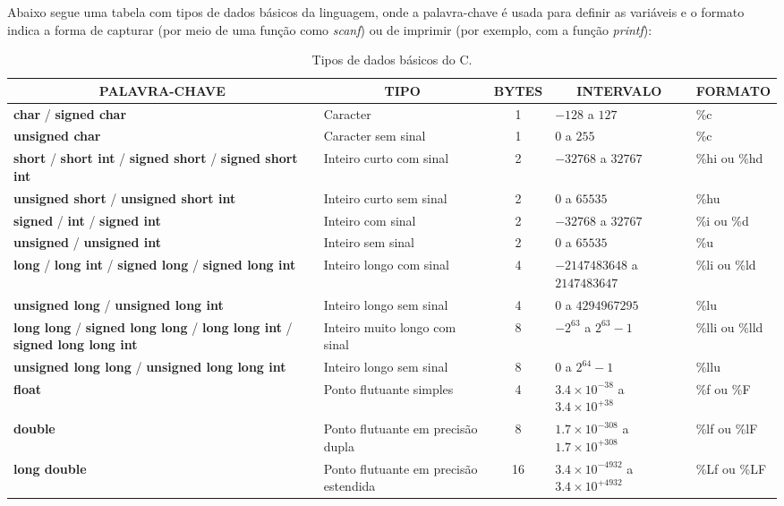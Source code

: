 Abaixo segue uma tabela com tipos de dados básicos da linguagem, onde a palavra-chave é usada para definir as variáveis e o formato indica a forma de capturar (por meio de uma função como \textit{scanf}) ou de imprimir (por exemplo, com a função \textit{printf}):
\begin{table}[!htbp]
\centering
\label{tab1}{
\begin{tabular}{|m{4.5cm}|m{2cm}|c|m{3cm}|m{2.6cm}|}
\hline
\multicolumn{1}{|c|}{\textbf{PALAVRA-CHAVE}} & \multicolumn{1}{c|}{\textbf{TIPO}} & \multicolumn{1}{c|}{\textbf{BYTES}} & \multicolumn{1}{c|}{\textbf{INTERVALO}} & \multicolumn{1}{c|}{\textbf{FORMATO}} \\\hline
\textbf{char} / \textbf{signed char} & Caracter & 1 & $-128$ a $127$ & \%c \\\hline
\textbf{unsigned char} & Caracter sem sinal & 1 & $0$ a $255$ & \%c \\\hline
\textbf{short} / \textbf{short int} / \textbf{signed short} / \textbf{signed short int} & Inteiro curto com sinal & 2 & $-32768$ a $32767$ & \%hi ou \%hd \\\hline
\textbf{unsigned short} / \textbf{unsigned short int} & Inteiro curto sem sinal & 2 & $0$ a $65535$ & \%hu \\\hline
\textbf{signed} / \textbf{int} / \textbf{signed int} & Inteiro com sinal & 2 & $-32768$ a $32767$ & \%i ou \%d \\\hline
\textbf{unsigned} / \textbf{unsigned int} & Inteiro sem sinal & 2 & $0$ a $65535$ & \%u \\\hline
\textbf{long} / \textbf{long int} / \textbf{signed long} / \textbf{signed long int} & Inteiro longo com sinal & 4 & $-2147483648$ a $2147483647$ & \%li ou \%ld \\\hline
\textbf{unsigned long} / \textbf{unsigned long int} & Inteiro longo sem sinal & 4 & $0$ a $4294967295$ & \%lu \\\hline
\textbf{long long} / \textbf{signed long long} / \textbf{long long int} / \textbf{signed long long int} & Inteiro muito longo com sinal & 8 & $-2^{63}$ a $2^{63}-1$ & \%lli ou \%lld \\\hline
\textbf{unsigned long long} / \textbf{unsigned long long int} & Inteiro longo sem sinal & 8 & $0$ a $2^{64}-1$ & \%llu \\\hline
\textbf{float} & Ponto flutuante simples & 4 & $3.4\times10^{-38}$ a $3.4\times10^{+38}$ & \%f ou \%F \\\hline
\textbf{double} & Ponto flutuante em precisão dupla & 8 & $1.7\times10^{-308}$ a $1.7\times10^{+308}$ & \%lf ou \%lF \\\hline
\textbf{long double} & Ponto flutuante em precisão estendida & 16 & $3.4\times10^{-4932}$ a $3.4\times10^{+4932}$ & \%Lf ou \%LF \\\hline
\end{tabular}}
\caption{Tipos de dados básicos do C.}
\end{table}

